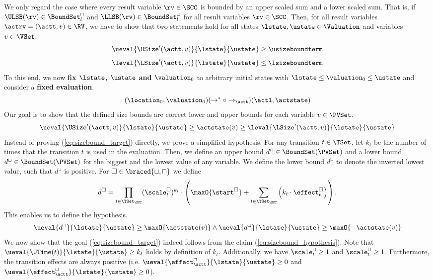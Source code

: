 We only regard the case where every result variable $\rv \in \SCC$ is bounded by an upper scaled sum and a lower scaled sum.
That is, if $\ULSB(\rv) \in \BoundSet^\sqcap_l$ and $\LLSB(\rv) \in \BoundSet^\sqcup_l$ for all result variables $\rv \in \SCC$.
Then, for all result variables $\actrv = (\actt, v) \in \RV$, we have to show that two statements hold for all states $\lstate, \ustate \in \Valuation$ and variables $v \in \VSet$.
\[ \ueval{\USize'(\actt, v)}{\lstate}{\ustate} \geq \usizeboundterm \]
\[ \leval{\LSize'(\actt, v)}{\lstate}{\ustate} \leq \lsizeboundterm \]
To this end, we now \textbf{fix $\lstate$, $\ustate$ and $\valuation_0$} to arbitrary initial states with $\lstate \leq \valuation_0 \leq \ustate$ and consider a \textbf{fixed evaluation}.
\[ (\location_0, \valuation_0) (\rightarrow^* \circ \rightarrow_\actt) (\actl, \actstate) \]
Our goal is to show that the defined size bounds are correct lower and upper bounds for each variable $v \in \PVSet$.
\begin{equation} \label{eq:sizebound_target}
  \ueval{\USize'(\actt, v)}{\lstate}{\ustate} \geq \actstate(v) \geq \leval{\LSize'(\actt, v)}{\lstate}{\ustate}
\end{equation}
Instead of proving (\ref{eq:sizebound_target}) directly, we prove a simplified hypothesis.
For any transition $t \in \TSet$, let $k_t$ be the number of times that the transition $t$ is used in the evaluation.
Then, we define an upper bound $d^\sqcap \in \BoundSet(\PVSet)$ and a lower bound $d^\sqcup \in \BoundSet(\PVSet)$ for the biggest and the lowest value of any variable.
We define the lower bound $d^\sqcup$ to denote the inverted lowest value, such that $d^\sqcup$ is positive.
For $\square \in \braced{\sqcup, \sqcap}$ we define
\[ d^\square = \prod_{t \in \TSet_\SCC} (\scale^\square_t)^{k_t} \cdot \left( \maxO{\start^\square} + \sum_{t \in \TSet_\SCC} \left( k_t \cdot \effect^\square_t \right) \right). \]
This enables us to define the hypothesis.
\begin{equation} \label{eq:sizebound_hypothesis}
  \ueval{d^\sqcap}{\lstate}{\ustate} \geq \maxO{\actstate(v)} \wedge \ueval{d^\sqcup}{\lstate}{\ustate} \geq \maxO{-\actstate(v)}
\end{equation}
We now show that the goal (\ref{eq:sizebound_target}) indeed follows from the claim (\ref{eq:sizebound_hypothesis}).
Note that $\ueval{\UTime(t)}{\lstate}{\ustate} \geq k_t$ holds by definition of $k_t$.
Additionally, we have $\scale^\sqcap_t \geq 1$ and $\scale^\sqcup_t \geq 1$.
Furthermore, the transition effects are always positive (i.e. $\ueval{\effect^\sqcap_\actt}{\lstate}{\ustate} \geq 0$ and $\ueval{\effect^\sqcup_\actt}{\lstate}{\ustate} \geq 0$).
